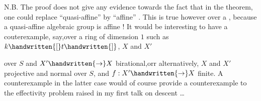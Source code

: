 N.B. The proof does not give any evidence towards the fact that in the theorem, one could replace ``quasi-affine'' by ``affine'' . This is true however over a , because a quasi-affine algebraic group is affine ! It would be interesting to have a couterexample, say,over a  ring of dimension $1$ such as $k\handwritten{[}t\handwritten{]}$, $X$ and $X'$   over $S$ and $X'\handwritten{\to}X$ birational,orr alternatively,  $X$ and $X'$ projective and normal over $S$, and $f:X'\handwritten{\to}X$ finite. A counterexample in the latter case would of course provide a counterexample to the effectivity problem  raised in my first talk on descent \dots

